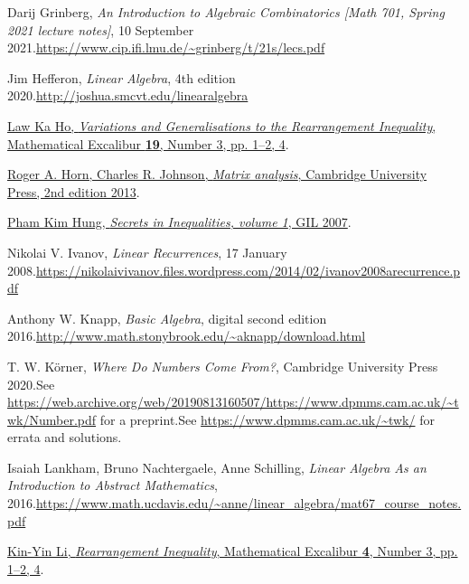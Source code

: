 \documentclass[numbers=enddot,12pt,final,onecolumn,notitlepage]{scrartcl}%
\numberwithin{exer}{subsection}
\theoremstyle{definition}
\begin{document}
\begin{thebibliography}{99999999}
Darij Grinberg, \textit{An Introduction to Algebraic
Combinatorics [Math 701, Spring 2021 lecture notes]}, 10 September
2021.\newline\url{https://www.cip.ifi.lmu.de/~grinberg/t/21s/lecs.pdf}

Jim Hefferon, \textit{Linear Algebra}, 4th edition
2020.\newline\url{http://joshua.smcvt.edu/linearalgebra}

%
\href{https://www.math.hkust.edu.hk/excalibur/v19_n3.pdf}{Law Ka Ho,
\textit{Variations and Generalisations to the Rearrangement Inequality},
Mathematical Excalibur \textbf{19}, Number 3, pp. 1--2, 4}.

%
\href{http://www.cse.zju.edu.cn/eclass/attachments/2015-10/01-1446086008-145421.pdf}{Roger
A. Horn, Charles R. Johnson, \textit{Matrix analysis}, Cambridge University
Press, 2nd edition 2013}.

%
\href{http://refkol.ro/matek/mathbooks/!Books!/Secrets in Inequalities (volume 1) Pham Kim Hung.pdf}{Pham
Kim Hung, \textit{Secrets in Inequalities, volume 1}, GIL 2007}.

Nikolai V. Ivanov, \textit{Linear Recurrences}, 17
January 2008.\newline\url{https://nikolaivivanov.files.wordpress.com/2014/02/ivanov2008arecurrence.pdf}

Anthony W. Knapp, \textit{Basic Algebra}, digital
second edition 2016.\newline\url{http://www.math.stonybrook.edu/~aknapp/download.html}

T. W. K\"{o}rner, \textit{Where Do Numbers Come
From?}, Cambridge University Press 2020.\newline See
\url{https://web.archive.org/web/20190813160507/https://www.dpmms.cam.ac.uk/~twk/Number.pdf}
for a preprint.\newline See \url{https://www.dpmms.cam.ac.uk/~twk/} for errata
and solutions.

Isaiah Lankham, Bruno Nachtergaele, Anne
Schilling, \textit{Linear Algebra As an Introduction to Abstract Mathematics},
2016.\newline\url{https://www.math.ucdavis.edu/~anne/linear_algebra/mat67_course_notes.pdf}

%
\href{https://www.math.hkust.edu.hk/excalibur/v4_n3.pdf}{Kin-Yin Li,
\textit{Rearrangement Inequality}, Mathematical Excalibur \textbf{4}, Number
3, pp. 1--2, 4}.


\end{thebibliography}
\end{document}
